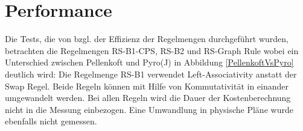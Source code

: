 \section{Performance}






Die Tests, die von \cite{shanbhag2014optimizing} bzgl. der Effizienz der Regelmengen durchgeführt wurden, betrachten die Regelmengen RS-B1-CPS, RS-B2 und RS-Graph Rule wobei ein Unterschied zwischen Pellenkoft und Pyro(J) in Abbildung \ref{PellenkoftVsPyro} deutlich wird: Die Regelmenge RS-B1 verwendet Left-Associativity anstatt der Swap Regel. Beide Regeln können mit Hilfe von Kommutativität in einander umgewandelt werden. 
Bei allen Regeln wird die Dauer der Kostenberechnung nicht in die Messung einbezogen. Eine Umwandlung in physische Pläne wurde ebenfalls nicht gemessen.


